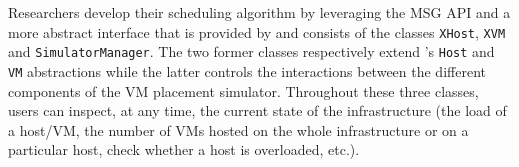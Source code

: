 Researchers develop their scheduling algorithm by leveraging the \sg
MSG API and a more abstract interface that is provided by \vmps
and consists of the classes \texttt{XHost}, \texttt{XVM} and
\texttt{SimulatorManager}. The two former classes respectively
extend \sg's \texttt{Host} and \texttt{VM} abstractions while the
latter controls the interactions between the different components of
the VM placement simulator.  Throughout these three classes, users can
inspect, at any time, the current state of the infrastructure (\ie the
load of a host/VM, the number of VMs hosted on the whole
infrastructure or on a particular host, check whether a host is
overloaded, etc.).




\vspace*{-.4cm}
